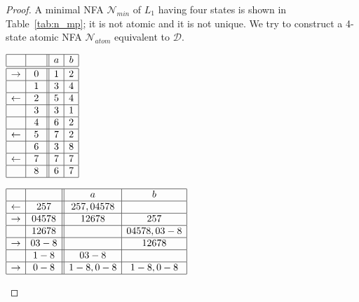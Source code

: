 \documentclass[preprint,12pt]{elsarticle}
\newcommand{\cD}{{\mathcal D}}
\newcommand{\cN}{{\mathcal N}}
\newcommand{\rev}{R}
\newcommand{\deter}{D}
\begin{document}
\begin{proof}
A minimal NFA $\cN_{min}$ of $L_1$ having four states is shown in 
Table~\ref{tab:n_mp}; it is not atomic and it is not unique. 
We try to construct a 4-state atomic NFA $\cN_{atom}$ equivalent to $\cD$. 
\begin{table}[hbt]
\begin{minipage}[b]{0.19\linewidth}
\caption{$\cD$.}
\label{tab:d_mp}
{\footnotesize
\begin{center}
$
\begin{array}{|c|c|| c|c|}    
\hline
 & &  a 
&  b   \\
\hline
\hline
\rightarrow & 0 
& 1 & 2  \\
\hline  
 & 1 
 &  3 &    4  \\
\hline  
\leftarrow & \ 2 \ 
&  5 &  4  \\
\hline  
 & 3 & 
3 &    1  \\
\hline  
 & 4 & 
6 &    2  \\
\hline  
\leftarrow & 5 & 
7 &    2  \\
\hline  
 & 6 & 
3 &    8  \\
\hline  
\leftarrow & 7 & 
7 &    7  \\
\hline  
 & 8 & 
6 &    7  \\
\hline  
\end{array}
$
\end{center}}
\end{minipage}
\hspace{0.03cm}
\begin{minipage}[b]{0.38\linewidth}
\caption{$\cD^{\rev\deter\rev}$.}
\label{tab:drdr_mp}
{\footnotesize
\begin{center}
$
\begin{array}{|c| c||c| c| }    
\hline
& 
& a  & b   \\
\hline  
\leftarrow & 257
& 257,04578 &  \\
\hline  
\rightarrow & 04578
&  12678 &   257  \\
\hline  
 & 12678 
&  & 04578,03-8   \\
\hline  
\rightarrow & 03-8
&   &   12678  \\
\hline  
 & 1-8
 &  03-8 &   \\
\hline  
\rightarrow & 0-8
&  1-8,0-8 &   1-8,0-8  \\
\hline  
\end{array}
$
\end{center}}
\end{minipage}
\hspace{0.83cm}
\begin{minipage}[b]{0.32\linewidth}

\end{minipage}
\end{table}
\end{proof}
\end{document}
